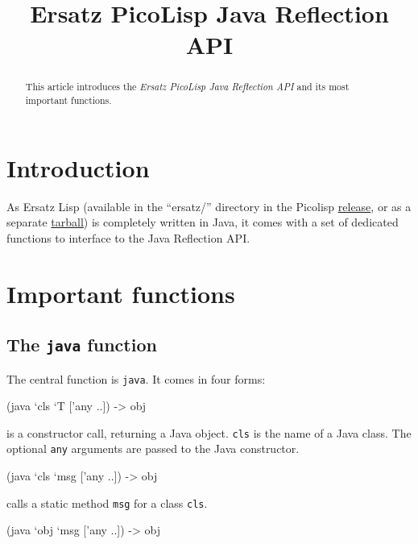 \title{Ersatz PicoLisp Java Reflection API}

\maketitle

\begin{abstract}
This article introduces the \emph{Ersatz PicoLisp Java Reflection API}
and its most important functions. 
\end{abstract}

\section{Introduction}
\label{sec:ersatz-java-reflection-introduction}

As Ersatz Lisp (available in the ``ersatz/'' directory in the Picolisp
\href{http://software-lab.de/picoLisp.tgz}{release}, or as a separate
\href{http://software-lab.de/ersatz.tgz}{tarball}) is completely
written in Java, it comes with a set of dedicated functions to
interface to the Java Reflection API.


\section{Important functions}
\label{sec:ersatz-java-reflection-important-functions}


\subsection{The \texttt{java} function}
\label{sec:ersatz-java-reflection-the-java-function}

The central function is \texttt{java}. It comes in four forms:

\begin{wideverbatim}
 (java `cls `T ['any ..]) -> obj
\end{wideverbatim}

is a constructor call, returning a Java object. \texttt{cls} is the
name of a Java class. The optional \texttt{any} arguments are passed
to the Java constructor.

\begin{wideverbatim}
 (java `cls `msg ['any ..]) -> obj
\end{wideverbatim}

calls a static method \texttt{msg} for a class \texttt{cls}.

\begin{wideverbatim}
 (java `obj `msg ['any ..]) -> obj
\end{wideverbatim}

